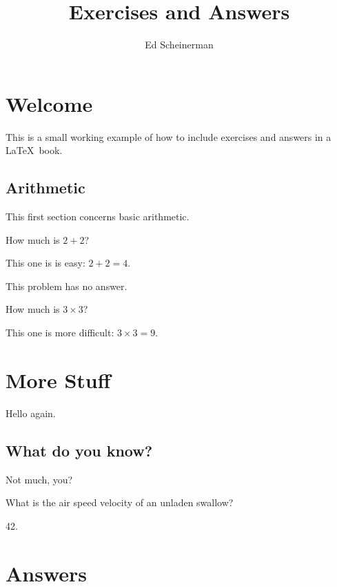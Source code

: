\documentclass{book}
\title{Exercises and Answers}
\author{Ed Scheinerman}
\date{}
\begin{document}
\maketitle
\tableofcontents

\mainmatter

\chapter{Welcome}
This is a small working example of how to include exercises and
answers in a \LaTeX\ book. 

\section{Arithmetic}
This first section concerns basic arithmetic.

\begin{exercises}

\item How much is $2+2$?
  \begin{answer}
    This one is is easy: $2+2 = 4$.
  \end{answer}

\item This problem has no answer.

\item How much is $3\times 3$? 
  \begin{answer}
    This one is more difficult: $3\times3 = 9$. 
  \end{answer}

\end{exercises}

\chapter{More Stuff}
Hello again.

\section{What do you know?}
Not much, you?

\begin{exercises}
  
\item What is the air speed velocity of an unladen swallow?
  \begin{answer}
    42.
  \end{answer}
  
\end{exercises}

\CloseMagicAnswerFile

\backmatter
\clearpage
\chapter*{Answers}

\end{document}

